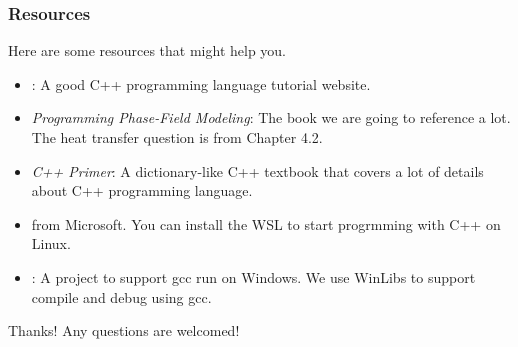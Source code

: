 \documentclass[compress,xcolor={dvipsnames}]{beamer}
\newcommand{\bhref}[2]{
    \href{#1}{\color{blue}{#2}}
}
\begin{document}
\begin{frame}
    \frametitle{Resources}

    Here are some resources that might help you.
    \begin{itemize}
        \item \bhref{https://www.runoob.com/cplusplus/cpp-tutorial.html}{Runoob C++}: A good C++ programming language tutorial website.
        \item \emph{Programming Phase-Field Modeling}: The book we are going to reference a lot. The heat transfer question is from Chapter 4.2.
        \item \emph{C++ Primer}: A dictionary-like C++ textbook that covers a lot of details about C++ programming language.
        \item \bhref{https://learn.microsoft.com/en-us/windows/wsl/install}{WSL Installation guide} from Microsoft. You can install the WSL to start progrmming with C++ on Linux.
        \item \bhref{https://www.mingw-w64.org/downloads/}{MinGW-w64 download page}: A project to support gcc run on Windows. We use WinLibs to support compile and debug using gcc.
    \end{itemize}

\end{frame}

\begin{frame}
    \begin{center}
        {\Huge \calligra Thanks!}
        \bigbreak
        {\huge Any questions are welcomed!}
    \end{center}
\end{frame}
\end{document}
